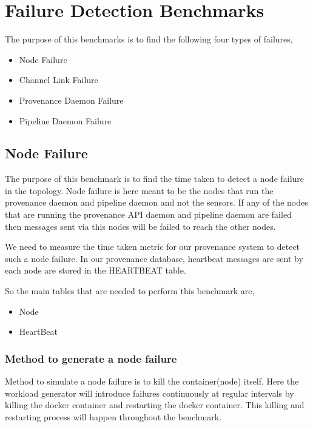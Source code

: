 
\section{Failure Detection Benchmarks}

The purpose of this benchmarks is to find the following four types of failures,
    \begin{itemize}
        \item Node Failure
        \item Channel Link Failure
        \item Provenance Daemon Failure
        \item Pipeline Daemon Failure
    \end{itemize}

\subsection{Node Failure}

The purpose of this benchmark is to find the time taken to detect a node failure in the topology. Node failure is here meant to be the nodes that run the provenance daemon and pipeline daemon and not the sensors. If any of the nodes that are running the provenance API daemon and pipeline daemon are failed then messages sent via this nodes will be failed to reach the other nodes.

We need to measure the time taken metric for our provenance system to detect such a node failure. In our provenance database, heartbeat messages are sent by each node are stored in the HEARTBEAT table.

So the main tables that are needed to perform this benchmark are,
    \begin{itemize}
        \item Node
        \item HeartBeat
    \end{itemize}

\subsubsection{Method to generate a node failure}

Method to simulate a node failure is to kill the container(node) itself. Here the workload generator will introduce failures continuously at regular intervals by killing the docker container and restarting the docker container. This killing and restarting process will happen throughout the benchmark.

